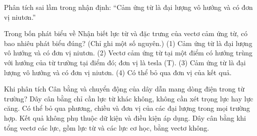 \begin{bt}
Phân tích sai lầm trong nhận định: “Cảm ứng từ là đại lượng vô hướng và có đơn vị niutơn.”
\end{bt}

\begin{ex}
Trong bốn phát biểu về Nhận biết lực từ và đặc trưng của vectơ cảm ứng từ, có bao nhiêu phát biểu đúng? (Chỉ ghi một số nguyên.) (1) Cảm ứng từ là đại lượng vô hướng và có đơn vị niutơn. (2) Vectơ cảm ứng từ tại một điểm có hướng trùng với hướng của từ trường tại điểm đó; đơn vị là tesla (T). (3) Cảm ứng từ là đại lượng vô hướng và có đơn vị niutơn. (4) Có thể bỏ qua đơn vị của kết quả.
\end{ex}

\begin{ex}
Khi phân tích Cân bằng và chuyển động của dây dẫn mang dòng điện trong từ trường?
\choice
{Dây cân bằng chỉ cần lực từ khác không, không cần xét trọng lực hay lực căng.}
{Có thể bỏ qua phương, chiều và đơn vị của các đại lượng trong mọi trường hợp.}
{Kết quả không phụ thuộc dữ kiện và điều kiện áp dụng.}
{\True Dây cân bằng khi tổng vectơ các lực, gồm lực từ và các lực cơ học, bằng vectơ không.}
\end{ex}


